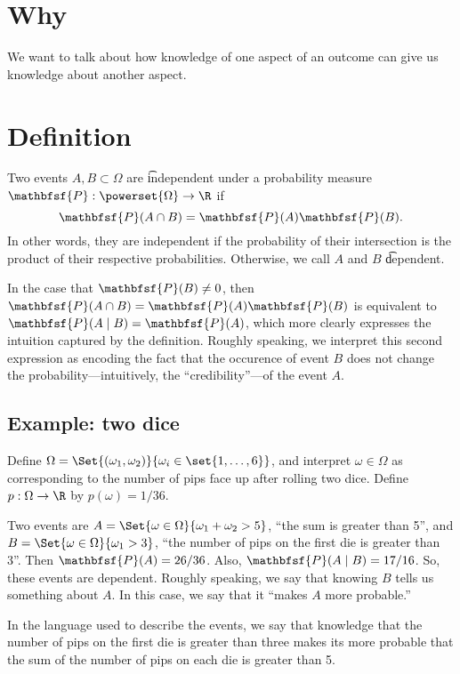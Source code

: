 
\section*{Why}

We want to talk about how knowledge of one aspect of an outcome can give us knowledge about another aspect.

\section*{Definition}

Two events $A, B \subset \Omega $ are \t{independent} under a probability measure $\mathbfsf{P} : \powerset{\Omega } \to \R $ if
\[
\mathbfsf{P} (A \cap  B) = \mathbfsf{P} (A)\mathbfsf{P} (B).
\]
In other words, they are independent if the probability of their intersection is the product of their respective probabilities.
Otherwise, we call $A$ and $B$ \t{dependent}.

In the case that $\mathbfsf{P} (B) \neq 0$, then $\mathbfsf{P} (A \cap  B) = \mathbfsf{P} (A)\mathbfsf{P} (B)$ is equivalent to $\mathbfsf{P} (A \mid B) = \mathbfsf{P} (A)$, which more clearly expresses the intuition captured by the definition.
Roughly speaking, we interpret this second expression as encoding the fact that the occurence of event $B$ does not change the probability---intuitively, the ``credibility''---of the event $A$.

\subsection*{Example: two dice}

Define $\Omega  = \Set{(\omega _1, \omega _2)}{ \omega _i \in \set{1, \dots , 6}}$, and interpret $\omega  \in \Omega $ as corresponding to the number of pips face up after rolling two dice.
Define $p: \Omega  \to \R $ by $p(\omega ) = 1/36$.

Two events are $A = \Set{\omega  \in \Omega }{ \omega _1 + \omega _2 > 5}$, ``the sum is greater than 5'', and $B = \Set{\omega  \in \Omega }{\omega _1 > 3}$, ``the number of pips on the first die is greater than 3''.
Then $\mathbfsf{P} (A) = 26/36$.
Also, $\mathbfsf{P} (A \mid  B) = 17/16$.
So, these events are dependent.
Roughly speaking, we say that knowing $B$ tells us something about $A$.
In this case, we say that it ``makes $A$ more probable.''

In the language used to describe the events, we say that knowledge that the number of pips on the first die is greater than three makes its more probable that the sum of the number of pips on each die is greater than 5.

